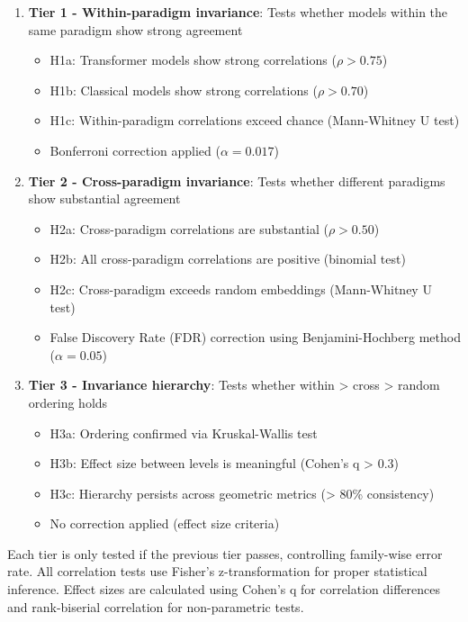 \documentclass[11pt,letterpaper]{article}
\begin{document}
\begin{enumerate}
\item \textbf{Tier 1 - Within-paradigm invariance}: Tests whether models within the same paradigm show strong agreement
   \begin{itemize}
   \item H1a: Transformer models show strong correlations ($\rho > 0.75$)
   \item H1b: Classical models show strong correlations ($\rho > 0.70$)
   \item H1c: Within-paradigm correlations exceed chance (Mann-Whitney U test)
   \item Bonferroni correction applied ($\alpha = 0.017$)
   \end{itemize}

\item \textbf{Tier 2 - Cross-paradigm invariance}: Tests whether different paradigms show substantial agreement
   \begin{itemize}
   \item H2a: Cross-paradigm correlations are substantial ($\rho > 0.50$)
   \item H2b: All cross-paradigm correlations are positive (binomial test)
   \item H2c: Cross-paradigm exceeds random embeddings (Mann-Whitney U test)
   \item False Discovery Rate (FDR) correction using Benjamini-Hochberg method ($\alpha = 0.05$)
   \end{itemize}

\item \textbf{Tier 3 - Invariance hierarchy}: Tests whether within > cross > random ordering holds
   \begin{itemize}
   \item H3a: Ordering confirmed via Kruskal-Wallis test
   \item H3b: Effect size between levels is meaningful (Cohen's q > 0.3)
   \item H3c: Hierarchy persists across geometric metrics (> 80\% consistency)
   \item No correction applied (effect size criteria)
   \end{itemize}
\end{enumerate}

Each tier is only tested if the previous tier passes, controlling family-wise error rate. All correlation tests use Fisher's z-transformation for proper statistical inference. Effect sizes are calculated using Cohen's q for correlation differences and rank-biserial correlation for non-parametric tests.
\end{document}
